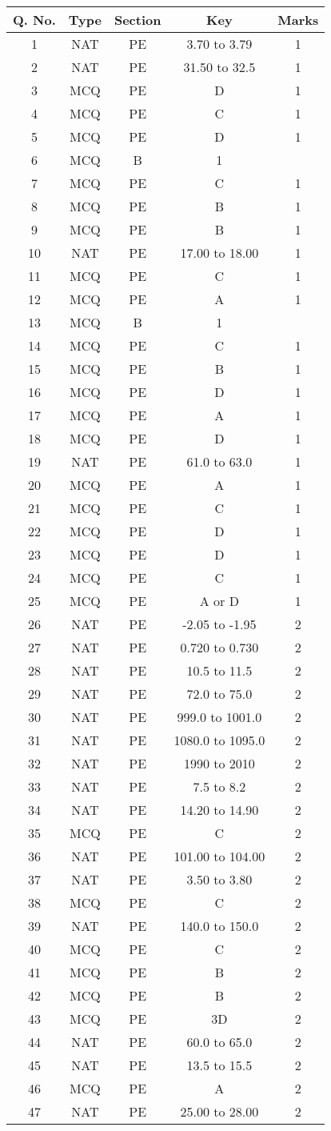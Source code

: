 \begin{tabular}[12pt]{|c|c|c|c|c|}
\hline
Q. No.&Type&Section&Key&Marks  \\
\hline
1&NAT&PE&3.70 to 3.79&1\\
\hline
2&NAT&PE&31.50 to 32.5&1\\
\hline
3&MCQ&PE&D&1\\
\hline
4&MCQ&PE&C&1\\
\hline
5&MCQ&PE&D&1\\
\hline
6&MCQ&B&1\\
\hline
7&MCQ&PE&C&1\\
\hline
8&MCQ&PE&B&1\\
\hline
9&MCQ&PE&B&1\\
\hline
10&NAT&PE&17.00 to 18.00&1\\
\hline
11&MCQ&PE&C&1\\
\hline
12&MCQ&PE&A&1\\
\hline
13&MCQ&B&1\\
\hline
14&MCQ&PE&C&1\\
\hline
15&MCQ&PE&B&1\\
\hline
16&MCQ&PE&D&1\\
\hline
17&MCQ&PE&A&1\\
\hline
18&MCQ&PE&D&1\\
\hline
19&NAT&PE&61.0 to 63.0&1\\
\hline
20&MCQ&PE&A&1\\
\hline
21&MCQ&PE&C&1\\
\hline
22&MCQ&PE&D&1\\
\hline
23&MCQ&PE&D&1\\
\hline
24&MCQ&PE&C&1\\
\hline
25&MCQ&PE&A or D&1\\
\hline
26&NAT&PE&-2.05 to -1.95&2\\
\hline
27&NAT&PE&0.720 to 0.730&2\\
\hline
28&NAT&PE&10.5 to 11.5&2\\
\hline
29&NAT&PE&72.0 to 75.0&2\\
\hline
30&NAT&PE&999.0 to 1001.0&2\\
\hline
31&NAT&PE&1080.0 to 1095.0&2\\
\hline
32&NAT&PE&1990 to 2010&2\\
\hline
33&NAT&PE&7.5 to 8.2&2\\
\hline
34&NAT&PE&14.20 to 14.90&2\\
\hline
35&MCQ&PE&C&2\\
\hline
36&NAT&PE&101.00 to 104.00&2\\
\hline
37&NAT&PE&3.50 to 3.80&2\\
\hline
38&MCQ&PE&C&2\\
\hline
39&NAT&PE&140.0 to 150.0&2\\
\hline
40&MCQ&PE&C&2\\
\hline
41&MCQ&PE&B&2\\
\hline
42&MCQ&PE&B&2\\
\hline
43&MCQ&PE&3D&2\\
\hline
44&NAT&PE&60.0 to 65.0&2\\
\hline
45&NAT&PE&13.5 to 15.5&2\\
\hline
46&MCQ&PE&A&2\\
\hline
47&NAT&PE&25.00 to 28.00&2\\
\hline
\end{tabular}

